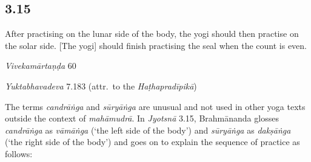 \begin{ekdosis}
\subsection*{3.15}
\begin{translation}[hp03_015]
After practising on the lunar side of the body, the yogi should then practise on the solar side. [The yogi] should finish practising the seal when the count is even.
\end{translation}

\begin{sources}[hp03_015]
\emph{Vivekamārtaṇḍa} 60
\begin{versinnote}
\end{versinnote}
\end{sources}

\begin{testimonia}[hp03_015]
\emph{Yuktabhavadeva} 7.183 (attr.~to the \emph{Haṭhapradīpikā})
\begin{versinnote}
\end{versinnote}
\end{testimonia}

\begin{philcomm}[hp03_015]
The terms \emph{candrāṅga} and \emph{sūryāṅga} are unusual and not used in other yoga texts outside the context of \emph{mahāmudrā}. In \emph{Jyotsnā} 3.15, Brahmānanda glosses \emph{candrāṅga} as \emph{vāmāṅga} (`the left side of the body') and \emph{sūryāṅga} as \emph{dakṣāṅga} (`the right side of the body') and goes on to explain the sequence of practice as follows:


\end{philcomm}
\end{ekdosis}
